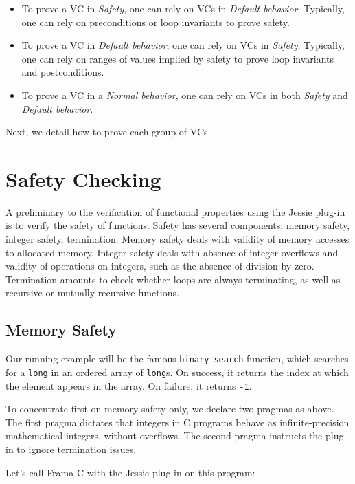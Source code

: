 \documentclass[a4paper,11pt,twoside,openright]{report}
\begin{document}
\begin{itemize}
\item To prove a VC in \textit{Safety}, one can rely on VCs in
  \textit{Default behavior}. Typically, one can rely on preconditions
  or loop invariants to prove safety.
\item To prove a VC in \textit{Default behavior}, one can rely on VCs
  in \textit{Safety}. Typically, one can rely on ranges of values
  implied by safety to prove loop invariants and postconditions.
\item To prove a VC in a \textit{Normal behavior}, one can rely on VCs
  in both \textit{Safety} and \textit{Default behavior}.
\end{itemize}

Next, we detail how to prove each group of VCs.

\chapter{Safety Checking}

A preliminary to the verification of functional properties 
using the Jessie plug-in is to
verify the safety of functions. Safety has several components: memory
safety, integer safety, termination. Memory safety deals with validity
of memory accesses to allocated memory. Integer safety deals with
absence of integer overflows and validity of operations on integers,
such as the absence of division by zero. Termination amounts to check
whether loops are always terminating, as well as recursive or
mutually recursive functions.

\section{Memory Safety}

Our running example will be the famous \verb|binary_search| function,
which searches for a {\tt long} in an ordered array of {\tt long}s. On
success, it returns the index at which the element appears in the
array. On failure, it returns \verb|-1|.



To concentrate first on memory safety only, we declare two pragmas as
above. The first pragma dictates that integers in C programs behave as
infinite-precision mathematical integers, without overflows. The
second pragma instructs the plug-in to ignore termination issues.

Let's call Frama-C with the Jessie plug-in on this program:
\end{document}
